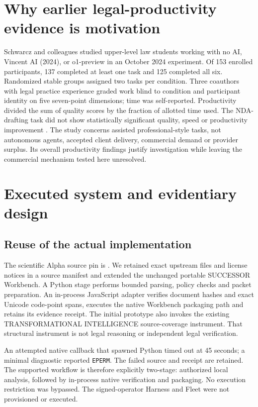 \documentclass[10pt,a4paper]{article}
\begin{document}
\section{Why earlier legal-productivity evidence is motivation}
Schwarcz and colleagues studied upper-level law students working with no AI, Vincent AI (2024), or o1-preview in an October 2024 experiment. Of 153 enrolled participants, 137 completed at least one task and 125 completed all six. Randomized stable groups assigned two tasks per condition. Three coauthors with legal practice experience graded work blind to condition and participant identity on five seven-point dimensions; time was self-reported. Productivity divided the sum of quality scores by the fraction of allotted time used. The NDA-drafting task did not show statistically significant quality, speed or productivity improvement \cite{schwarcz}. The study concerns assisted professional-style tasks, not autonomous agents, accepted client delivery, commercial demand or provider surplus. Its overall productivity findings justify investigation while leaving the commercial mechanism tested here unresolved.

\section{Executed system and evidentiary design}
\subsection{Reuse of the actual implementation}
The scientific Alpha source pin is . We retained exact upstream files and license notices in a source manifest and extended the unchanged portable SUCCESSOR Workbench. A Python stage performs bounded parsing, policy checks and packet preparation. An in-process JavaScript adapter verifies document hashes and exact Unicode code-point spans, executes the native Workbench packaging path and retains its evidence receipt. The initial prototype also invokes the existing TRANSFORMATIONAL INTELLIGENCE source-coverage instrument. That structural instrument is not legal reasoning or independent legal verification.

An attempted native callback that spawned Python timed out at 45 seconds; a minimal diagnostic reported \texttt{EPERM}. The failed source and receipt are retained. The supported workflow is therefore explicitly two-stage: authorized local analysis, followed by in-process native verification and packaging. No execution restriction was bypassed. The signed-operator Harness and Fleet were not provisioned or executed.
\end{document}
